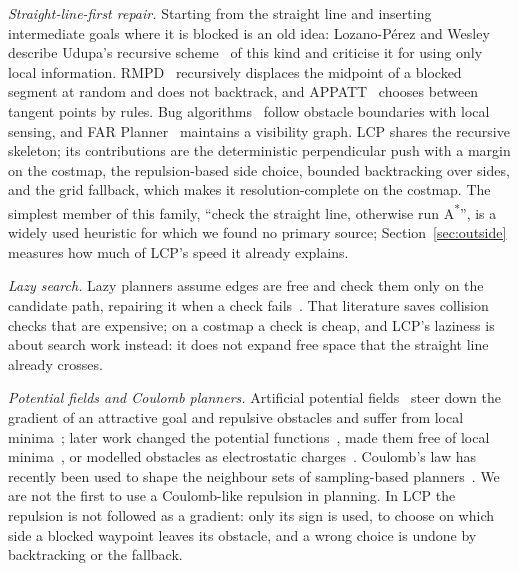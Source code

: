\documentclass[conference]{IEEEtran}
\newcommand{\lcp}{LCP}
\begin{document}
\emph{Straight-line-first repair.} Starting from the straight line and inserting
intermediate goals where it is blocked is an old idea: Lozano-P{\'e}rez and
Wesley~\cite{lozanoperez1979algorithm} describe Udupa's recursive
scheme~\cite{udupa1977collision} of this kind and criticise it for using only local information. RMPD~\cite{li2018rmpd}
recursively displaces the midpoint of a blocked segment at random and does not
backtrack, and APPATT~\cite{liu2022appatt} chooses between tangent points by
rules. Bug algorithms~\cite{lumelsky1987path,kamon1998tangentbug} follow obstacle
boundaries with local sensing, and FAR Planner~\cite{yang2022far} maintains a
visibility graph. \lcp{} shares the recursive skeleton; its contributions are
the deterministic perpendicular push with a margin on the costmap, the
repulsion-based side choice, bounded backtracking over sides, and the grid
fallback, which makes it resolution-complete on the costmap. The simplest member of this
family, ``check the straight line, otherwise run A\textsuperscript{*}'', is a
widely used heuristic for which we found no primary source; Section~\ref{sec:outside}
measures how much of \lcp{}'s speed it already explains.

\emph{Lazy search.} Lazy planners assume edges are free and check them only on
the candidate path, repairing it when a check fails~\cite{bohlin2000lazy,mandalika2019gls}.
That literature saves collision checks that are expensive; on a costmap a check
is cheap, and \lcp{}'s laziness is about search work instead: it does not
expand free space that the straight line already crosses.

\emph{Potential fields and Coulomb planners.} Artificial potential
fields~\cite{khatib1985real} steer down the gradient of an attractive goal and
repulsive obstacles and suffer from local minima~\cite{koren1991potential};
later work changed the potential functions~\cite{ge2000new}, made them free of
local minima~\cite{rimon1992exact}, or modelled obstacles as electrostatic
charges~\cite{valavanis2000electrostatic}. Coulomb's law has recently been used
to shape the neighbour sets of sampling-based planners~\cite{zhang2024fdit}.
We are not the first to use a Coulomb-like repulsion in planning. In \lcp{}
the repulsion is not followed as a gradient: only its sign is used, to choose on
which side a blocked waypoint leaves its obstacle, and a wrong choice is undone
by backtracking or the fallback.
\end{document}

